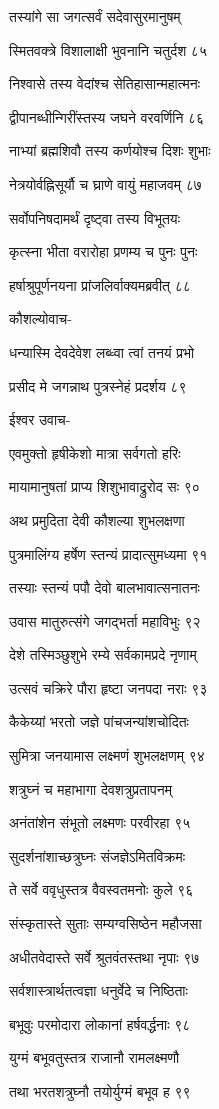 तस्यांगे सा जगत्सर्वं सदेवासुरमानुषम्

स्मितवक्त्रे विशालाक्षी भुवनानि चतुर्दश ८५

निश्वासे तस्य वेदांश्च सेतिहासान्महात्मनः

द्वीपानब्धीन्गिरींस्तस्य जघने वरवर्णिनि ८६

नाभ्यां ब्रह्मशिवौ तस्य कर्णयोश्च दिशः शुभाः

नेत्रयोर्वह्निसूर्यौ च घ्राणे वायुं महाजवम् ८७

सर्वोपनिषदामर्थं दृष्ट्वा तस्य विभूतयः

कृत्स्ना भीता वरारोहा प्रणम्य च पुनः पुनः

हर्षाश्रुपूर्णनयना प्रांजलिर्वाक्यमब्रवीत् ८८

कौशल्योवाच-

धन्यास्मि देवदेवेश लब्ध्वा त्वां तनयं प्रभो

प्रसीद मे जगन्नाथ पुत्रस्नेहं प्रदर्शय ८९

ईश्वर उवाच-

एवमुक्तो हृषीकेशो मात्रा सर्वगतो हरिः

मायामानुषतां प्राप्य शिशुभावाद्रुरोद सः ९०

अथ प्रमुदिता देवी कौशल्या शुभलक्षणा

पुत्रमालिंग्य हर्षेण स्तन्यं प्रादात्सुमध्यमा ९१

तस्याः स्तन्यं पपौ देवो बालभावात्सनातनः

उवास मातुरुत्संगे जगद्भर्ता महाविभुः ९२

देशे तस्मिञ्छुशुभे रम्ये सर्वकामप्रदे नृणाम्

उत्सवं चक्रिरे पौरा हृष्टा जनपदा नराः ९३

कैकेय्यां भरतो जज्ञे पांचजन्यांशचोदितः

सुमित्रा जनयामास लक्ष्मणं शुभलक्षणम् ९४

शत्रुघ्नं च महाभागा देवशत्रुप्रतापनम्

अनंतांशेन संभूतो लक्ष्मणः परवीरहा ९५

सुदर्शनांशाच्छत्रुघ्नः संजज्ञेऽमितविक्रमः

ते सर्वे ववृधुस्तत्र वैवस्वतमनोः कुले ९६

संस्कृतास्ते सुताः सम्यग्वसिष्ठेन महौजसा

अधीतवेदास्ते सर्वे श्रुतवंतस्तथा नृपाः ९७

सर्वशास्त्रार्थतत्वज्ञा धनुर्वेदे च निष्ठिताः

बभूवुः परमोदारा लोकानां हर्षवर्द्धनाः ९८

युग्मं बभूवतुस्तत्र राजानौ रामलक्ष्मणौ

तथा भरतशत्रुघ्नौ तयोर्युग्मं बभूव ह ९९

